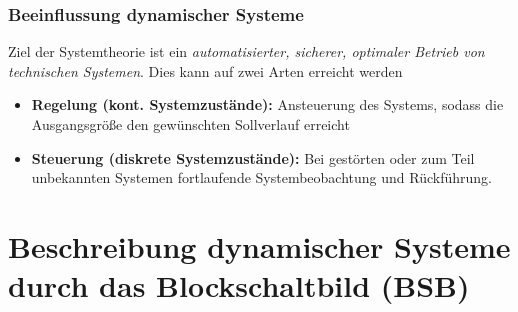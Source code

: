 \documentclass[12pt,a4paper,ngerman]{scrartcl}
\begin{document}
\subsubsection*{Beeinflussung dynamischer Systeme}
Ziel der Systemtheorie ist ein \emph{automatisierter, sicherer, optimaler Betrieb von technischen Systemen}. Dies kann auf zwei Arten erreicht werden
\begin{itemize}
\item \textbf{Regelung (kont. Systemzustände):} Ansteuerung des Systems, sodass die Ausgangsgröße den gewünschten Sollverlauf erreicht
\item \textbf{Steuerung (diskrete Systemzustände):} Bei gestörten oder zum Teil unbekannten Systemen fortlaufende Systembeobachtung und Rückführung.
\end{itemize}

\section{Beschreibung dynamischer Systeme durch das Blockschaltbild (BSB)}
\end{document}
